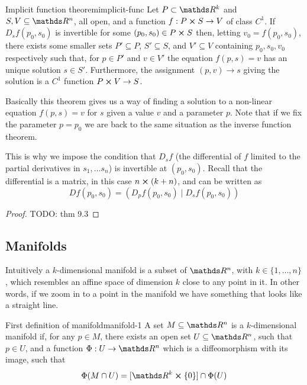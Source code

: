 \documentclass[12pt]{extarticle}
\begin{document}
\begin{theorem}{Implicit function theorem}{implicit-func}
	Let $P \subset \R^k$ and $S, V \subseteq \R^n$, all open, and a function $f: P \cross S \to V$ of
	class $C^1$.
	If $D_s f(p_0, s_0)$ is invertible for some $(p_0, s_0) \in P \cross S$ then, letting
	$v_0 = f(p_0, s_0)$, there exists some smaller sets $P' \subseteq P$, $S'\subseteq S$, and
	$V' \subseteq V$ containing $p_0, s_0, v_0$ respectively such that, for $p \in P'$ and $v \in V'$
	the equation $f(p, s) = v$ has an unique solution $s \in S'$.
	Furthermore, the assignment $(p, v) \to s$ giving the solution is a $C^1$ function
	$P \cross V \to S$.
\end{theorem}

Basically this theorem gives us a way of finding a solution to a non-linear equation $f(p, s) = v$
for $s$ given a value $v$ and a parameter $p$.
Note that if we fix the parameter $p = p_0$ we are back to the same situation as the inverse
function theorem.

This is why we impose the condition that $D_s f$ (the differential of $f$ limited to the partial
derivatives in $s_1, \dots s_n$) is invertible at $(p_0, s_0)$.
Recall that the differential is a matrix, in this case $n \cross (k + n)$, and can be written as
\begin{equation}
	Df(p_0, s_0) = (D_p f(p_0, s_0) \mid D_s f(p_0, s_0))
\end{equation}

\begin{proof}
	TODO: thm 9.3
\end{proof}

\subsection{Manifolds}

Intuitively a $k$-dimensional manifold is a subset of $\R^n$, with $k \in \{1, \dots, n\}$, which
resembles an affine space of dimension $k$ close to any point in it. In other words, if we zoom in
to a point in the manifold we have something that looks like a straight line.

\begin{definition}{First definition of manifold}{manifold-1}
	A set $M \subseteq \R^n$ is a $k$-dimensional manifold if, for any $p \in M$, there exists an open
	set $U \subseteq \R^n$, such that $p \in U$, and a function $\Phi : U \to \R^n$ which is a diffeomorphism with
	its image, such that
	\begin{equation}
		\Phi(M \cap U) = [\R^k \cross \{0\}] \cap \Phi(U)
	\end{equation}
\end{definition}
\end{document}
